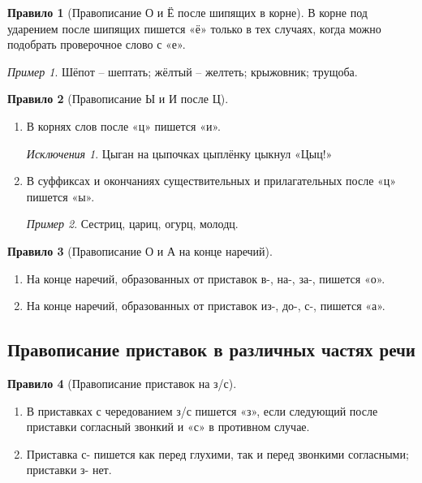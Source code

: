 \documentclass[12pt]{article}
\theoremstyle{definition}
\newtheorem{rrule}{Правило}[section]
\theoremstyle{remark}
\newtheorem*{example}{Пример}
\newtheorem*{exception}{Исключения}
\begin{document}
\begin{rrule}[Правописание О и Ё после шипящих в корне]
    В корне под ударением после шипящих пишется «ё» только в тех случаях, когда можно подобрать проверочное слово с «е».
    \begin{example}
        Шёпот -- шептать; жёлтый -- желтеть; крыжовник; трущоба.
    \end{example}
\end{rrule}

\begin{rrule}[Правописание Ы и И после Ц]
    \hfill
    \begin{enumerate}
        \item В корнях слов после «ц» пишется «и».
        \begin{exception}
            Цыган на цыпочках цыплёнку цыкнул «Цыц!»
        \end{exception}
        \item В суффиксах и окончаниях существительных и прилагательных после «ц» пишется «ы».
        \begin{example}
            Сестриц, цариц, огурц, молодц.
        \end{example}
    \end{enumerate}
\end{rrule}

\begin{rrule}[Правописание О и А на конце наречий]
    \hfill
    \begin{enumerate}
        \item На конце наречий, образованных от приставок в-, на-, за-, пишется «о».
        \item На конце наречий, образованных от приставок из-, до-, с-, пишется «а».
    \end{enumerate}
\end{rrule}

\subsection{Правописание приставок в различных частях речи}

\begin{rrule}[Правописание приставок на з/с]
    \hfill
    \begin{enumerate}
        \item В приставках с чередованием з/с пишется «з», если следующий после приставки согласный звонкий и «с» в противном случае.
        \item Приставка с- пишется как перед глухими, так и перед звонкими согласными; приставки з- нет.
    \end{enumerate}
\end{rrule}
\end{document}
